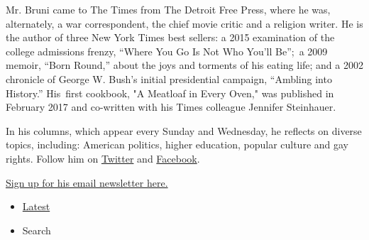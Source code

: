 Mr. Bruni came to The Times from The Detroit Free Press, where he was,
alternately, a war correspondent, the chief movie critic and a religion
writer. He is the author of three New York Times best sellers: a 2015
examination of the college admissions frenzy, ``Where You Go Is Not Who
You'll Be'';~a 2009 memoir, ``Born Round,'' about the joys and torments
of his eating life; and a 2002 chronicle of George W. Bush's initial
presidential campaign, ``Ambling into History.'' His~first cookbook, "A
Meatloaf in Every Oven," was published in February 2017 and co-written
with his Times colleague Jennifer Steinhauer.~

In his columns, which appear every Sunday and Wednesday, he reflects on
diverse topics, including: American politics, higher education, popular
culture and gay rights. Follow him on
\href{https://twitter.com/frankbruni}{Twitter} and
\href{https://www.facebookcorewwwi.onion/frankbruninyt}{Facebook}.

\href{https://www.nytimes3xbfgragh.onion/newsletters/frank-bruni}{Sign
up for his email newsletter here.}

\begin{itemize}
\tightlist
\item
  \protect\hyperlink{stream-panel}{Latest}
\item
  Search
\end{itemize}

